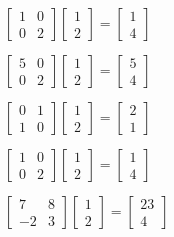 \documentclass[
  letterpaper,
  DIV=11,
  numbers=noendperiod]{scrartcl}
\begin{document}
\(\begin{bmatrix}1 & 0 \\ 0 & 2 \end{bmatrix}\begin{bmatrix} 1 \\ 2 \end{bmatrix} = \begin{bmatrix}1 \\ 4\end{bmatrix}\)

\(\begin{bmatrix} 5 & 0 \\ 0 & 2 \end{bmatrix}\begin{bmatrix} 1 \\ 2 \end{bmatrix} = \begin{bmatrix} 5 \\ 4 \end{bmatrix}\)

\(\begin{bmatrix}0 & 1 \\ 1 & 0 \end{bmatrix}\begin{bmatrix}1 \\ 2 \end{bmatrix} = \begin{bmatrix}2 \\ 1 \end{bmatrix}\)

\(\begin{bmatrix}1 & 0 \\ 0 & 2\end{bmatrix}\begin{bmatrix}1 \\ 2\end{bmatrix} = \begin{bmatrix}1 \\ 4\end{bmatrix}\)

\(\begin{bmatrix}7 & 8 \\ -2 & 3 \end{bmatrix}\begin{bmatrix}1 \\ 2\end{bmatrix} = \begin{bmatrix}23 \\ 4\end{bmatrix}\)
\end{document}
